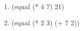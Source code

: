 \begin{enumerate}
	\newpage
	\item (equal (* 4 7) 21)
	\begin{figure}[H]
	\end{figure}

	\item (equal (* 2 3) (+ 7 2))
	\begin{figure}[H]
	\end{figure}
	

\end{enumerate}

